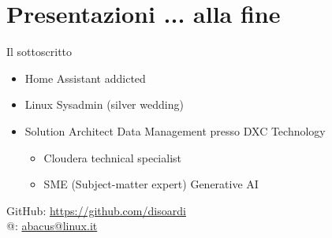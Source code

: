 \documentclass{beamer}
\begin{document}
		\section*{Presentazioni ... alla fine}
		\begin{frame}{Il sottoscritto}
	
			\begin{itemize}
				\item Home Assistant addicted
				\item Linux Sysadmin (silver wedding)
				\item Solution Architect Data Management presso DXC Technology
				\begin{itemize}
					\item Cloudera technical specialist
					\item SME (Subject-matter expert) Generative AI
				\end{itemize}
			\end{itemize}
		 	\vspace{0.5cm}
			GitHub: \href{https://github.com/disoardi}{https://github.com/disoardi} \\
			@: \href{mailto:abacus@linux.it}{abacus@linux.it}
			
		\end{frame}
\end{document}
